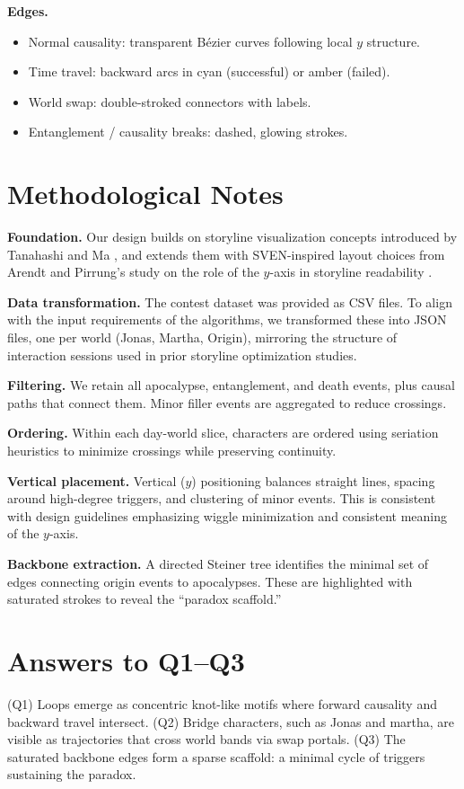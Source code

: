 \documentclass[a4paper,UKenglish]{lipics-v2021}
\begin{document}
\textbf{Edges.}  
\begin{itemize}
  \item Normal causality: transparent Bézier curves following local $y$ structure.  
  \item Time travel: backward arcs in cyan (successful) or amber (failed).  
  \item World swap: double-stroked connectors with labels.  
  \item Entanglement / causality breaks: dashed, glowing strokes.  
\end{itemize}

\section*{Methodological Notes}
\textbf{Foundation.} Our design builds on storyline visualization concepts introduced by Tanahashi and Ma \cite{TanahashiMa2012Storyline}, and extends them with SVEN-inspired layout choices from Arendt and Pirrung’s study on the role of the $y$-axis in storyline readability \cite{Arendt2017YMatters}.  

\textbf{Data transformation.} The contest dataset was provided as CSV files. To align with the input requirements of the algorithms, we transformed these into JSON files, one per world (Jonas, Martha, Origin), mirroring the structure of interaction sessions used in prior storyline optimization studies.  

\textbf{Filtering.} We retain all apocalypse, entanglement, and death events, plus causal paths that connect them. Minor filler events are aggregated to reduce crossings.  

\textbf{Ordering.} Within each day-world slice, characters are ordered using seriation heuristics to minimize crossings while preserving continuity.  

\textbf{Vertical placement.} Vertical ($y$) positioning balances straight lines, spacing around high-degree triggers, and clustering of minor events. This is consistent with design guidelines emphasizing wiggle minimization and consistent meaning of the $y$-axis.  

\textbf{Backbone extraction.} A directed Steiner tree identifies the minimal set of edges connecting origin events to apocalypses. These are highlighted with saturated strokes to reveal the ``paradox scaffold.''  

\section*{Answers to Q1--Q3}
(Q1) Loops emerge as concentric knot-like motifs where forward causality and backward travel intersect.  
(Q2) Bridge characters, such as Jonas and martha, are visible as trajectories that cross world bands via swap portals.  
(Q3) The saturated backbone edges form a sparse scaffold: a minimal cycle of triggers sustaining the paradox.  
\end{document}
